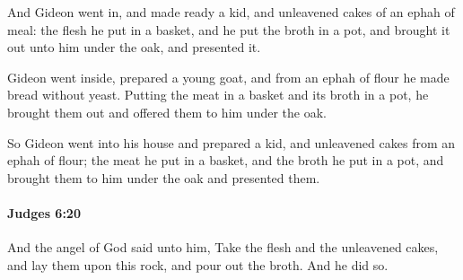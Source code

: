 			\begin{versebox}
					\item[BHS] 
					\item[ASV] And Gideon went in, and made ready a kid, and unleavened cakes of an ephah of meal: the flesh he put in a basket, and he put the broth in a pot, and brought it out unto him under the oak, and presented it.
					\item[NIV] Gideon went inside, prepared a young goat, and from an ephah of flour he made bread without yeast. Putting the meat in a basket and its broth in a pot, he brought them out and offered them to him under the oak.
					\item[NRSV] So Gideon went into his house and prepared a kid, and unleavened cakes from an ephah of flour; the meat he put in a basket, and the broth he put in a pot, and brought them to him under the oak and presented them.
			\end{versebox}

		\paragraph{Judges 6:20} %
			\label{JUDGES-6-20}

			And the angel of God said unto him, Take the flesh and the unleavened cakes, and lay them upon this rock, and pour out the broth. And he did so.

